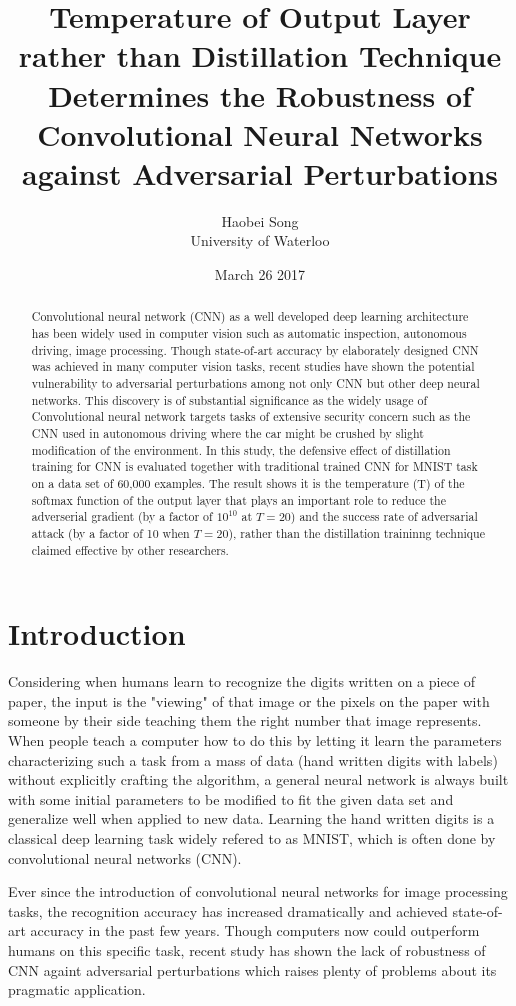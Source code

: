 \documentclass{article}
\title{\textbf{Temperature of Output Layer rather than Distillation Technique Determines the Robustness of Convolutional Neural Networks against Adversarial Perturbations\cite{Papernot}}}
\author{Haobei Song \\
        University of Waterloo}
\date{March 26 2017}
\begin{document}
\maketitle
{}
\newpage
{}

\begin{abstract}
	Convolutional neural network (CNN) as a well developed deep learning architecture has been widely used in computer vision such as automatic inspection, autonomous driving, image processing. 
	Though state-of-art accuracy by elaborately designed CNN was achieved in many computer vision tasks, 
	recent studies have shown the potential vulnerability to adversarial perturbations among not only CNN but other deep neural networks.
	This discovery is of substantial significance as the widely usage of Convolutional neural network targets tasks of extensive security concern
	such as the CNN used in autonomous driving where the car might be crushed by slight modification of the environment. 
	In this study, the defensive effect of distillation training for CNN is evaluated together with traditional trained CNN for MNIST task on a data set of 60,000 examples.
	The result shows it is the temperature (T) of the softmax function of the output layer that plays an important role to reduce the adverserial gradient (by a factor of $10^{10}$ at $T=20$) and the success rate of adversarial attack (by a factor of 10 when $T=20$),
 rather than the distillation traininng technique claimed effective by other researchers.
\end{abstract}
\section{Introduction}
Considering when humans learn to recognize the digits written on a piece of paper, the input is the "viewing" of that image or the pixels on the paper with someone by their side teaching them the right number that image represents.
When people teach a computer how to do this by letting it learn the parameters characterizing such a task from a mass of data (hand written digits with labels) without explicitly crafting the algorithm, 
a general neural network is always built with some initial parameters to be modified to fit the given data set and generalize well when applied to new data. Learning the hand written digits is a classical deep learning task widely refered to as MNIST, which is often done by convolutional neural networks (CNN).

Ever since the introduction of convolutional neural networks for image processing tasks, the recognition accuracy has increased dramatically and achieved state-of-art accuracy in the past few years. Though computers now could outperform humans on this specific task,
recent study has shown the lack of robustness of CNN againt adversarial perturbations which raises plenty of problems about its pragmatic application. 
\end{document}
